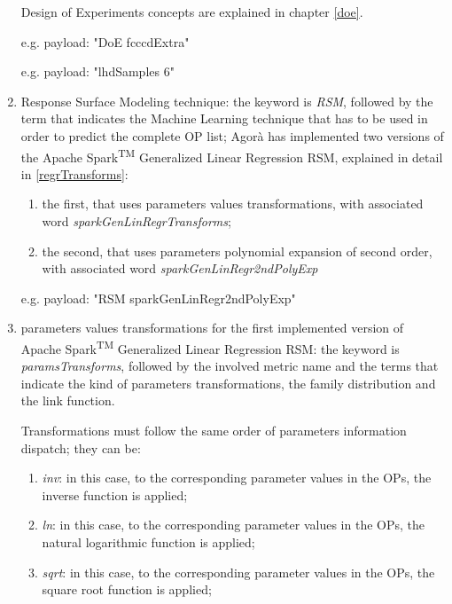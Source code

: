 \begin{enumerate}
    Design of Experiments concepts are explained in chapter \ref{doe}.
    
    e.g. payload: "DoE fcccdExtra"
    
    e.g. payload: "lhdSamples 6"
    
    \item Response Surface Modeling technique: the keyword is \textit{RSM}, followed by the term that indicates the Machine Learning technique that has to be used in order to predict the complete OP list; Agorà has implemented two versions of the Apache Spark\textsuperscript{TM} Generalized Linear Regression RSM, explained in detail in \ref{regrTransforms}:
    
    \begin{enumerate}
    
        \item the first, that uses parameters values transformations, with associated word \textit{sparkGenLinRegrTransforms};
        
        \item the second, that uses parameters polynomial expansion of second order, with associated word \textit{sparkGenLinRegr2ndPolyExp}
    
    \end{enumerate}
    
    e.g. payload: "RSM sparkGenLinRegr2ndPolyExp"
    
    \item parameters values transformations for the first implemented version of Apache Spark\textsuperscript{TM} Generalized Linear Regression RSM: the keyword is \textit{paramsTransforms}, followed by the involved metric name and the terms that indicate the kind of parameters transformations, the family distribution and the link function.
    
    Transformations must follow the same order of parameters information dispatch; they can be:
    
    \begin{enumerate}
    
        \item \textit{inv}: in this case, to the corresponding parameter values in the OPs, the inverse function is applied;
        
        \item \textit{ln}: in this case, to the corresponding parameter values in the OPs, the natural logarithmic function is applied;
        
        \item \textit{sqrt}: in this case, to the corresponding parameter values in the OPs, the square root function is applied;
        

\end{enumerate}
\end{enumerate}
